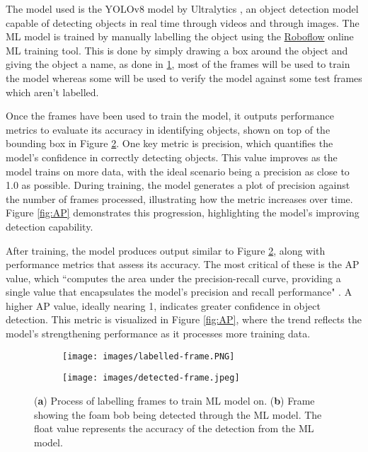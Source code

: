 The model used is the YOLOv8 model by Ultralytics \cite{ultralytics_yolov8_nodate}, an object detection model capable of detecting objects in real time through videos and through images. The ML model is trained by manually labelling the object using the \href{https://roboflow.com/}{Roboflow} online ML training tool. This is done by simply drawing a box around the object and giving the object a name, as done in \ref{fig:train-frame}, most of the frames will be used to train the model whereas some will be used to verify the model against some test frames which aren't labelled.

Once the frames have been used to train the model, it outputs performance metrics to evaluate its accuracy in identifying objects, shown on top of the bounding box in Figure \ref{fig:det-frame}. One key metric is precision, which quantifies the model’s confidence in correctly detecting objects. This value improves as the model trains on more data, with the ideal scenario being a precision as close to 1.0 as possible. During training, the model generates a plot of precision against the number of frames processed, illustrating how the metric increases over time. Figure \ref{fig:AP} demonstrates this progression, highlighting the model’s improving detection capability.

After training, the model produces output similar to Figure \ref{fig:det-frame}, along with performance metrics that assess its accuracy. The most critical of these is the \ac{AP} value, which ``computes the area under the precision-recall curve, providing a single value that encapsulates the model's precision and recall performance" \cite{noauthor_yolo_nodate}. A higher AP value, ideally nearing 1, indicates greater confidence in object detection. This metric is visualized in Figure \ref{fig:AP}, where the trend reflects the model's strengthening performance as it processes more training data.

\begin{figure}[h!]
    \centering
    \begin{subfigure}[b]{.7\textwidth}
      \centering
      \texttt{[image: images/labelled-frame.PNG]}
      \caption{}
      \label{fig:train-frame}
    \end{subfigure}%
    \begin{subfigure}[b]{.3\textwidth}
      \centering
      \texttt{[image: images/detected-frame.jpeg]}
      \caption{}
      \label{fig:det-frame}
    \end{subfigure}
    \caption{(\textbf{a}) Process of labelling frames to train ML model on. (\textbf{b}) Frame showing the foam bob being detected through the ML model. The float value represents the accuracy of the detection from the ML model.}
    \label{fig:eqip-setup}
\end{figure}

